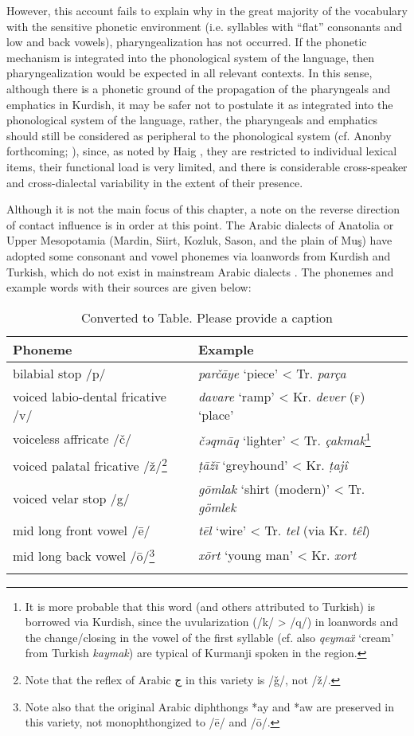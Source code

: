 \documentclass[output=paper]{langsci/langscibook}
\begin{document}
However, this account fails to explain why in the great majority of the vocabulary with the sensitive phonetic environment (i.e. syllables with “flat” consonants and low and back vowels), pharyngealization has not occurred. If the phonetic mechanism is integrated into the phonological system of the language, then pharyngealization would be expected in all relevant contexts. In this sense, although there is a phonetic ground of the propagation of the pharyngeals and emphatics in Kurdish, it may be safer not to postulate it as integrated into the phonological system of the language, rather, the pharyngeals and emphatics should still be considered as peripheral to the phonological system (cf. Anonby forthcoming; \citealt{Haig2007}), since, as noted by Haig \citep[167]{Haig2007}, they are restricted to individual lexical items, their functional load is very limited, and there is considerable cross-speaker and cross-dialectal variability in the extent of their presence. 

Although it is not the main focus of this chapter, a note on the reverse direction of contact influence is in order at this point. The Arabic dialects of Anatolia or Upper Mesopotamia (Mardin, Siirt, Kozluk, Sason, and the plain of Muş) have adopted some consonant and vowel phonemes via loanwords from Kurdish and Turkish, which do not exist in mainstream Arabic dialects \citep[84]{Jastrow2011}. The phonemes and example words with their sources are given below:

\begin{table}
\begin{tabular}{ll}
\lsptoprule 
Phoneme & Example\\\midrule
bilabial stop /p/   &   \textit{parčāye} ‘piece’ < Tr. \textit{parça}\\
voiced labio-dental fricative /v/  & \textit{davare} ‘ramp’  < Kr. \textit{dever} (\textsc{f)} ‘place’\\
voiceless affricate /č/     &  \textit{čǝqmāq} ‘lighter’ < Tr. \textit{çakmak}\footnote{It is more probable that this word (and others attributed to Turkish) is borrowed via Kurdish, since the uvularization (/k/ > /q/) in loanwords and the change/closing in the vowel of the first syllable (cf. also \textit{qeymaẍ} ‘cream’ from Turkish \textit{kaymak}) are typical of Kurmanji spoken in the region.}\\
voiced palatal fricative /ž/\footnote{Note that the reflex of Arabic ج in this variety is /ǧ/, not /ž/.}    & \textit{ṭāžī} ‘greyhound’ < Kr. \textit{ṭajî}\\
voiced velar stop /g/      & \textit{gōmlak} ‘shirt (modern)’ < Tr. \textit{gömlek}\\
mid long front vowel /ē/    & \textit{tēl} ‘wire’ < Tr. \textit{tel} (via Kr. \textit{têl})\\
mid long back vowel /ō/\footnote{Note also that the original Arabic diphthongs *ay and *aw are preserved in this variety, not monophthongized to /ē/ and /ō/.}  &  \textit{xōrt} ‘young man’ < Kr. \textit{xort}\\
\lspbottomrule
\end{tabular}
\caption{\color{red}Converted to Table. Please provide a caption}
\end{table}
\end{document}
